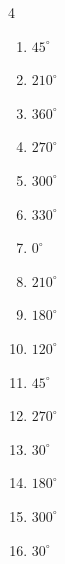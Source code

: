 \begin{multicols}{4}
\begin{enumerate}
  \item $\displaystyle 45^{\circ}$

  \item $\displaystyle 210^{\circ}$

  \item $\displaystyle 360^{\circ}$
        \phantom{$\displaystyle =2\pi$}

  \item $\displaystyle 270^{\circ}$

  \item $\displaystyle 300^{\circ}$

  \item $\displaystyle 330^{\circ}$

  \item $\displaystyle 0^{\circ}$
        \phantom{$\displaystyle =0$}

\columnbreak %

\resetques

  \item $\displaystyle 210^{\circ}$

  \item $\displaystyle 180^{\circ}$
        \phantom{$\displaystyle =\pi$}

  \item $\displaystyle 120^{\circ}$

  \item $\displaystyle 45^{\circ}$

  \item $\displaystyle 270^{\circ}$

  \item $\displaystyle 30^{\circ}$

  \item $\displaystyle 180^{\circ}$
        \phantom{$\displaystyle =\pi$}

  \item $\displaystyle 300^{\circ}$

  \item $\displaystyle 30^{\circ}$


\end{enumerate}
\end{multicols}

